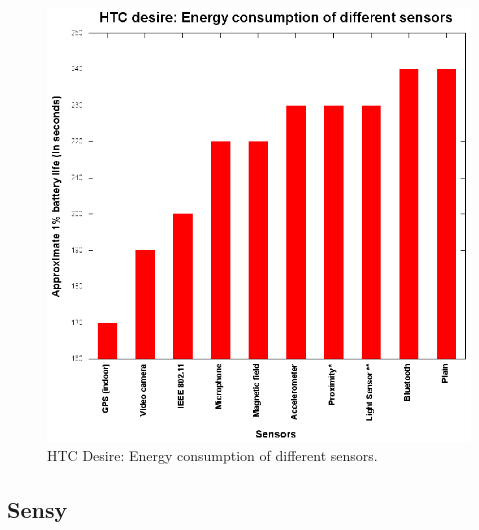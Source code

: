 \begin{figure}[H]
\centering
\includegraphics[scale=1.5]{plots/htc_desire.eps}
\caption{HTC Desire: Energy  consumption of different sensors.}
\end{figure}

\subsection{Sensy}